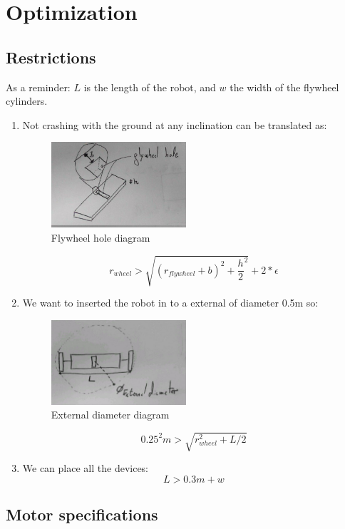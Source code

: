 \section{Optimization}

\subsection{Restrictions}
As a reminder: $L$ is the length of the robot, and $w$ the width of the flywheel cylinders.
\begin{enumerate}
\item Not crashing with the ground at any inclination can be translated as:
\begin{figure}[ht]
	\centering
	\includegraphics[width=5cm]{img/flywheel_hole.jpg}
	\caption{Flywheel hole diagram}
	\label{fig:Flywheel hole diagram}
\end{figure}
\[r_{wheel}> \sqrt{(r_{flywheel} + b)^2+\frac{h}{2}^2} + 2*\epsilon\]
\item We want to inserted the robot in to a external of diameter 0.5m so:
\begin{figure}[ht]
	\centering
	\includegraphics[width=5cm]{img/external_diameter.jpg}
	\caption{External diameter diagram}
	\label{fig:External diameter diagram}
\end{figure}
\[0.25^2 m > \sqrt{r_{wheel}^2 + L/2}\]
\item We can place all the devices:
\[L > 0.3m + w \]
\end{enumerate}

\subsection{Motor specifications}

